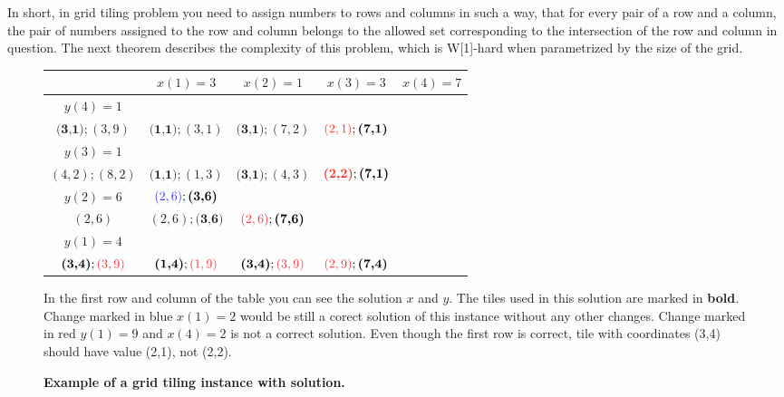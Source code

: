 In short, in grid tiling problem you need to assign numbers
to rows and columns in such a way,
that for every pair of a row and a column,
the pair of numbers assigned
to the row and column 
belongs to the allowed set corresponding to the intersection
of the row and column in question.
The next theorem describes the complexity of this problem,
which is W[1]-hard when parametrized by the size of the grid.


\begin{figure}[h]
\begin{center}
\begin{tabular}{ c|c|c|c|c| } 
          & $x(1)=3$ & $x(2)=1$ & $x(3)=3$ & $x(4) = 7$\\ 
 \hline
 $y(4)=1$
	& \makecell{$\textcolor{alternative_sol}{(2,1)};(2,2);$\\$\textbf{(3,1)};(3,9)$}
	& $\textbf{(1,1)}; (3,1)$
	& $\textbf{(3,1)}; (7,2)$
	& $\textcolor{bad_sol}{(2,1)}; \textbf{(7,1)}$\\ 
 \hline
 $y(3)=1$
	& \makecell{$\textcolor{alternative_sol}{(2,1)};\textbf{(3,1)};$\\$(4,2);(8,2)$}
	& $\textbf{(1,1)}; (1,3)$
	& $\textbf{(3,1)}; (4,3)$
	& $\textcolor{bad_sol}{\textbf{(2,2)}}; \textbf{(7,1)}$\\ 
 \hline
 $y(2)=6$
	& $\textcolor{alternative_sol}{(2,6)};\textbf{(3,6)}$
	& \makecell{$(1,2); \textbf{(1,6)};$\\$(2,6)$}
	& $(2,6); \textbf{(3,6)}$
	& $\textcolor{bad_sol}{(2,6)};\textbf{(7,6)}$\\ 
 \hline
 $y(1)=4$
	& \makecell{$\textcolor{alternative_sol}{(2,4)};(2,6);$\\$\textbf{(3,4)};\textcolor{bad_sol}{(3,9)}$}
	& $\textbf{(1,4)}; \textcolor{bad_sol}{(1,9)}$
	& $\textbf{(3,4)}; \textcolor{bad_sol}{(3,9)}$
	& $\textcolor{bad_sol}{(2,9)}; \textbf{(7,4)}$\\ 
 \hline
\end{tabular}
\end{center}
\caption{\textbf{Example of a grid tiling instance with solution.}}
In the first row and column of the table you can see the solution $x$ and $y$.
The tiles used in this solution are marked in \textbf{bold}.
Change marked in \textcolor{alternative_sol}{blue} $x(1)=2$ would be still a corect solution
of this instance without any other changes.
Change marked in \textcolor{bad_sol}{red} $y(1)=9$ and $x(4)=2$ is not a correct solution.
Even though the first row is correct,
tile with coordinates (3,4) should have value (2,1), not (2,2).
\label{fig:grid_tiling_exmample}
\end{figure}

